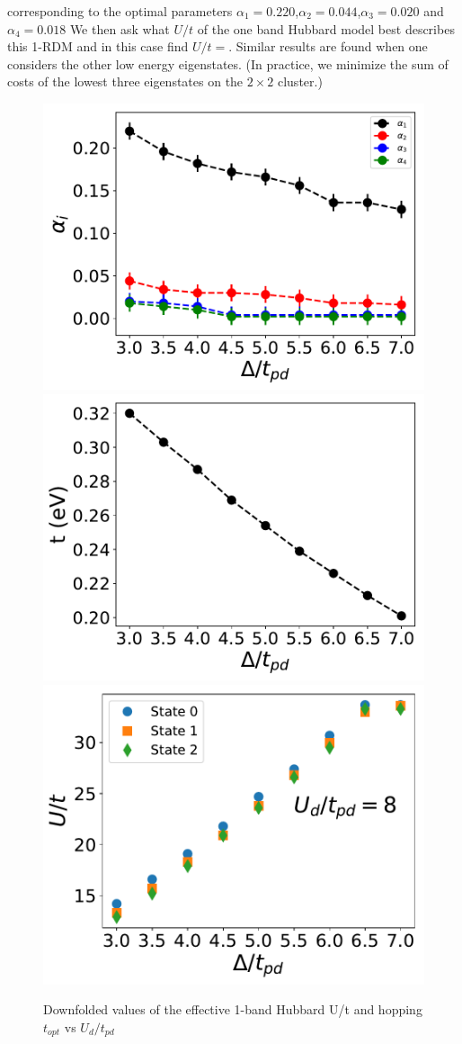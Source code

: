 corresponding to the optimal parameters $\alpha_1=0.220$,$\alpha_2=0.044$,$\alpha_3=0.020$ and $\alpha_4=0.018$ 
We then ask what $U/t$ of the one band Hubbard model best describes this 1-RDM and in this case find $U/t = $. 
Similar results are found when one considers the other low energy eigenstates. 
(In practice, we minimize the sum of costs of the lowest three eigenstates on the $2 \times 2$ cluster.) 

\begin{figure}[]
\centering
\includegraphics[width=0.49\linewidth]{./Figures/Hyb_vs_U_Ud_8.pdf}
\includegraphics[width=0.49\linewidth]{./Figures/Hopping_vs_U_Ud_8.pdf}
\includegraphics[width=0.49\linewidth]{./Figures/downfolded_U_Ud_8.pdf}
\caption{Downfolded values of the effective 1-band Hubbard U/t and hopping $t_{opt}$ vs $U_d/t_{pd}$}
\label{fig:hamfit} 
\end{figure}	

